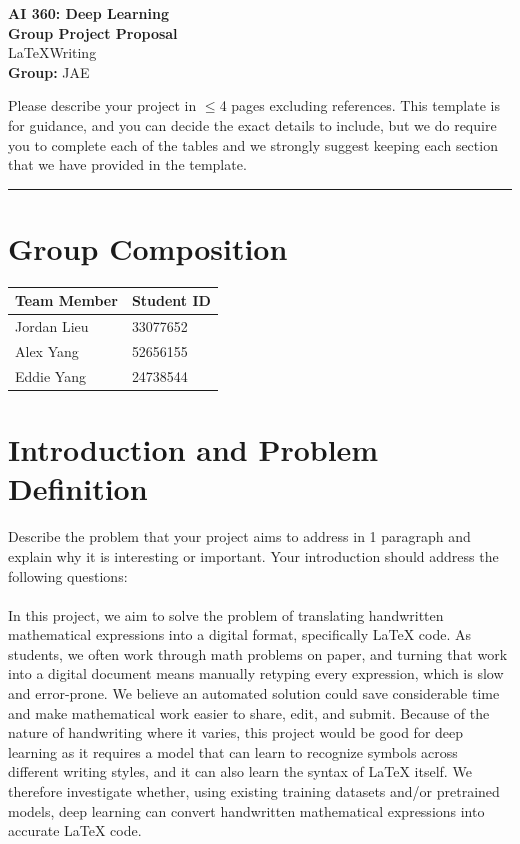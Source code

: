 \documentclass[11pt]{article}
\newcommand{\coursename}{AI 360: Deep Learning}
\newcommand{\groupname}{JAE}
\newcommand{\projecttitle}{LaTeXWriting}
\newcommand{\blue}[1]{\textcolor{cyan!60!black}{#1}}
\begin{document}
\begin{center}
    {\Large \textbf{\coursename}}\\[0.4em]
    {\LARGE \textbf{Group Project Proposal}}\\[1em]
    {\large \projecttitle}\\[1em]
    \textbf{Group:} \groupname\\
\end{center}

Please describe your project in $\leq$4 pages excluding references.
This template is for guidance, and you can decide the exact details to include, but we do require you to complete each of the tables and we strongly suggest keeping each section that we have provided in the template.

\vspace{0.5em}
\hrule
\vspace{1em}

\section{Group Composition}

\begin{center}
\begin{tabularx}{\textwidth}{l l}
    \toprule
    \textbf{Team Member} &
    \textbf{Student ID} \\
    \midrule
    \blue{Jordan Lieu} & \blue{33077652} \\
    \blue{Alex Yang} & \blue{52656155} \\
    \blue{Eddie Yang} & \blue{24738544} \\
    \bottomrule
\end{tabularx}
\end{center}

\section{Introduction and Problem Definition}

Describe the problem that your project aims to address in 1 paragraph and
explain why it is interesting or important. Your introduction should address the following questions: \\\\
\blue{
In this project, we aim to solve the problem of translating handwritten mathematical expressions into a digital format, specifically \LaTeX{} code. As students, we often work through math problems on paper, and turning that work into a digital document means manually retyping every expression, which is slow and error-prone. We believe an automated solution could save considerable time and make mathematical work easier to share, edit, and submit. Because of the nature of handwriting where it varies, this project would be good for deep learning as it requires a model that can learn to recognize symbols across different writing styles, and it can also learn the syntax of \LaTeX{} itself. We therefore investigate whether, using existing training datasets and/or pretrained models, deep learning can convert handwritten mathematical expressions into accurate \LaTeX{} code.
}
\end{document}
